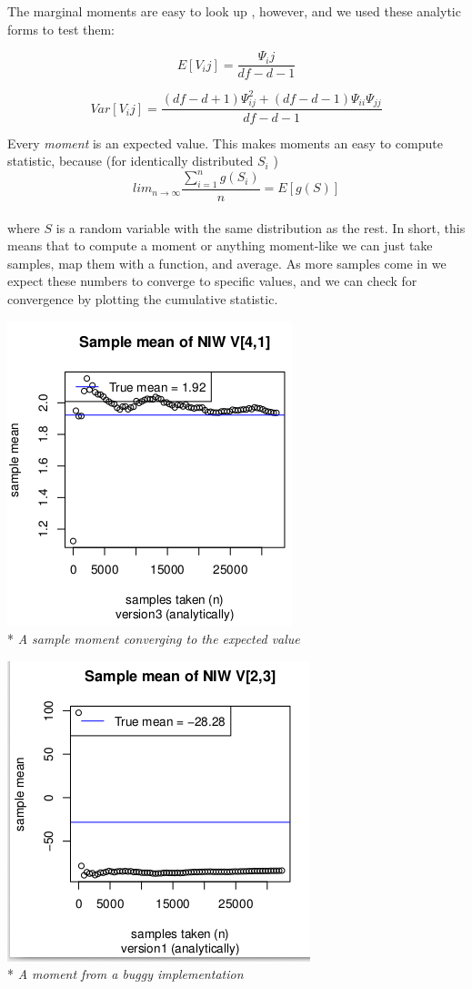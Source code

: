 \documentclass[english]{report}
\begin{document}
The marginal moments are easy to look up \cite{Wikipedia1}, however, and we used these analytic forms to test them:

\[ E[V_ij] =  \frac{\Psi_ij}{df - d - 1} \]

\[ Var[V_ij] =  \frac{(df - d  +1)\Psi_{ij}^2 + (df-d-1)\Psi_{ii}\Psi_{jj}}{df - d - 1} \]


Every \emph{moment} is an expected value. This makes moments an easy to compute statistic,
 because (for identically distributed $ S_i $ )
$$ lim_{n \rightarrow \infty} \frac{\sum_{i=1}^n g(S_i)}{n} = E[g(S)] $$ \\
where $S$ is a random variable with the same distribution as the rest.
In short, this means that to compute a moment or anything moment-like we can just take samples, map them with a function, and average.
As more samples come in we expect these numbers to converge to specific values, and we can check for convergence by plotting the cumulative statistic.


\begin{center}
\includegraphics[scale=.8]{momentcorrect.png}\\*
\emph{A sample moment converging to the expected value}
\end{center}

\begin{center}
\includegraphics[scale=.8]{momentincorrect.png}\\*
\emph{A moment from a buggy implementation}
\\  
\end{center}
\end{document}
